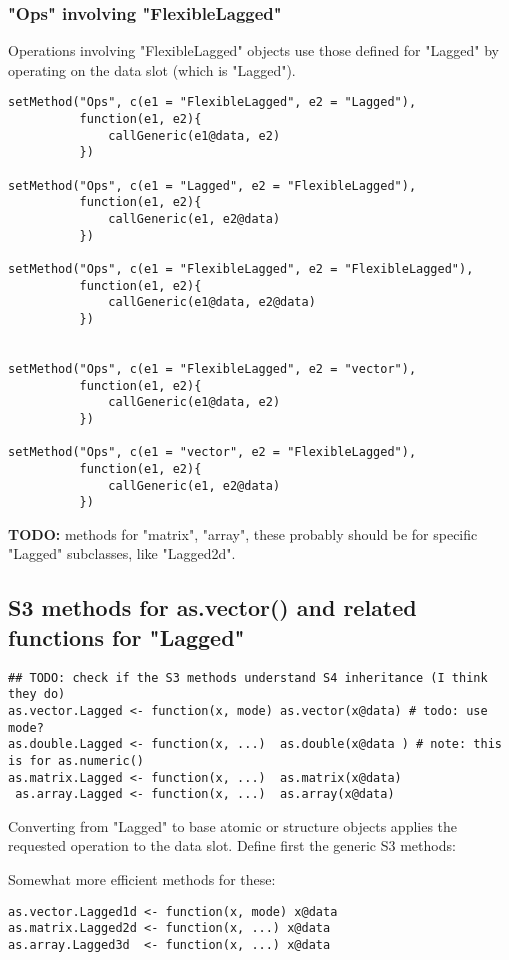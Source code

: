 \documentclass[11pt,a4paper]{article}
\begin{document}
\subsubsection{"Ops" involving "FlexibleLagged"}
\label{sec:org0625d79}

Operations involving "FlexibleLagged" objects use those defined for "Lagged" by operating on
the data slot (which is "Lagged").
\begin{verbatim}
setMethod("Ops", c(e1 = "FlexibleLagged", e2 = "Lagged"),
          function(e1, e2){
              callGeneric(e1@data, e2)
          })

setMethod("Ops", c(e1 = "Lagged", e2 = "FlexibleLagged"),
          function(e1, e2){
              callGeneric(e1, e2@data)
          })

setMethod("Ops", c(e1 = "FlexibleLagged", e2 = "FlexibleLagged"),
          function(e1, e2){
              callGeneric(e1@data, e2@data)
          })


setMethod("Ops", c(e1 = "FlexibleLagged", e2 = "vector"),
          function(e1, e2){
              callGeneric(e1@data, e2)
          })

setMethod("Ops", c(e1 = "vector", e2 = "FlexibleLagged"),
          function(e1, e2){
              callGeneric(e1, e2@data)
          })
\end{verbatim}

\textbf{TODO:} methods for "matrix", "array", these probably should be for specific "Lagged"
subclasses, like "Lagged2d".


\subsection{S3 methods for as.vector() and related functions for "Lagged"}
\label{sec:org6498f77}

\begin{verbatim}
## TODO: check if the S3 methods understand S4 inheritance (I think they do)
as.vector.Lagged <- function(x, mode) as.vector(x@data) # todo: use mode?
as.double.Lagged <- function(x, ...)  as.double(x@data ) # note: this is for as.numeric()
as.matrix.Lagged <- function(x, ...)  as.matrix(x@data)
 as.array.Lagged <- function(x, ...)  as.array(x@data)
\end{verbatim}
Converting from "Lagged" to base atomic or structure objects applies the requested
operation to the data slot. Define first the generic S3 methods:

Somewhat more efficient methods for these:
\begin{verbatim}
as.vector.Lagged1d <- function(x, mode) x@data
as.matrix.Lagged2d <- function(x, ...) x@data
as.array.Lagged3d  <- function(x, ...) x@data
\end{verbatim}
\end{document}
